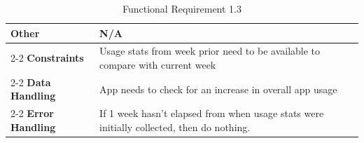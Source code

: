\documentclass[12pt]{article}
\begin{document}
\begin{table}[H]
{\begin{tabular}{@{}l|l@{}}
\textbf{Other}               & N/A                                                                                                                                                                                                                                                                                                                                                                                                  \\ \cmidrule(l){2-2} 
\textbf{Constraints}         & Usage stats from week prior need to be available to compare with current week                                                                                                                                                                                                                                                                                                                        \\ \cmidrule(l){2-2} 
\textbf{Data Handling}       & App needs to check for an increase in overall app usage                                                                                                                                                                                                                                                                                                                                              \\ \cmidrule(l){2-2} 
\textbf{Error Handling}      & If 1 week hasn't elapsed from when usage stats were initially collected, then do nothing.                                                                                                                                                                                                                                                                                                            \\ \bottomrule
\end{tabular}%
}
\caption[]{Functional Requirement 1.3}
\label{tab:func-req-1-3}
\end{table}
\end{document}
